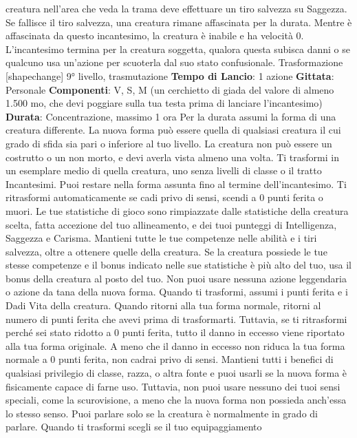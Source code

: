\begin{multicols}{2}
creatura nell’area che veda la trama deve effettuare un
tiro salvezza su Saggezza. Se fallisce il tiro salvezza,
una creatura rimane affascinata per la durata. Mentre è
affascinata da questo incantesimo, la creatura è inabile
e ha velocità 0.
L’incantesimo termina per la creatura soggetta, qualora
questa subisca danni o se qualcuno usa un’azione per
scuoterla dal suo stato confusionale.
Trasformazione
[shapechange]
9° livello, trasmutazione
\textbf{Tempo di Lancio}: 1 azione
\textbf{Gittata}: Personale
\textbf{Componenti}: V, S, M (un cerchietto di giada del valore
di almeno 1.500 mo, che devi poggiare sulla tua testa
prima di lanciare l’incantesimo)
\textbf{Durata}: Concentrazione, massimo 1 ora
Per la durata assumi la forma di una creatura differente.
La nuova forma può essere quella di qualsiasi creatura
il cui grado di sfida sia pari o inferiore al tuo livello. La 
creatura non può essere un costrutto o un non morto, e
devi averla vista almeno una volta. Ti trasformi in un
esemplare medio di quella creatura, uno senza livelli di
classe o il tratto Incantesimi.
Puoi restare nella forma assunta fino al termine
dell’incantesimo. Ti ritrasformi automaticamente se cadi
privo di sensi, scendi a 0 punti ferita o muori.
Le tue statistiche di gioco sono rimpiazzate dalle
statistiche della creatura scelta, fatta accezione del tuo
allineamento, e dei tuoi punteggi di Intelligenza,
Saggezza e Carisma. Mantieni tutte le tue competenze
nelle abilità e i tiri salvezza, oltre a ottenere quelle della
creatura. Se la creatura possiede le tue stesse
competenze e il bonus indicato nelle sue statistiche è
più alto del tuo, usa il bonus della creatura al posto del
tuo. Non puoi usare nessuna azione leggendaria o
azione da tana della nuova forma.
Quando ti trasformi, assumi i punti ferita e i Dadi Vita
della creatura. Quando ritorni alla tua forma normale,
ritorni al numero di punti ferita che avevi prima di
trasformarti. Tuttavia, se ti ritrasformi perché sei stato
ridotto a 0 punti ferita, tutto il danno in eccesso viene
riportato alla tua forma originale. A meno che il danno in
eccesso non riduca la tua forma normale a 0 punti
ferita, non cadrai privo di sensi.
Mantieni tutti i benefici di qualsiasi privilegio di classe,
razza, o altra fonte e puoi usarli se la nuova forma è
fisicamente capace di farne uso. Tuttavia, non puoi
usare nessuno dei tuoi sensi speciali, come la
scurovisione, a meno che la nuova forma non possieda
anch’essa lo stesso senso. Puoi parlare solo se la
creatura è normalmente in grado di parlare.
Quando ti trasformi scegli se il tuo equipaggiamento

\end{multicols}
